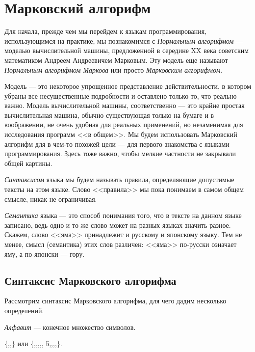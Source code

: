 \setcounter{chapter}{1}
\section{Марковский алгорифм}
\par
Для начала, прежде чем мы перейдем к языкам программирования, использующимся 
на практике, мы познакомимся с \emph{Нормальным алгорифмом} --- моделью 
вычислительной машины, предложенной в середине XX века советским математиком 
Андреем Андреевичем Марковым. Эту модель еще называют \emph{Нормальным 
алгорифмом Маркова} или просто \emph{Марковским алгорифмом}.

Модель --- это некоторое упрощенное представление действительности, в котором
убраны все несущественные подробности и оставлено только то, что реально важно.
Модель вычислительной машины, соответственно --- это крайне простая
вычислительная машина, обычно существующая только на бумаге и в воображении,
не очень удобная для реальных применений, но незаменимая для исследования 
программ <<в общем>>. Мы будем использовать Марковский алгорифм для в чем-то
похожей цели --- для первого знакомства с языками программирования.
Здесь тоже важно, чтобы мелкие частности не закрывали общей картины.

\emph{Синтаксисом} языка мы будем называть правила, определяющие допустимые
тексты на этом языке. Слово <<правила>> мы пока понимаем в самом общем 
смысле, никак не ограничивая.

\emph{Семантика} языка --- это способ понимания того, 
что в тексте на данном языке записано, ведь одно и то же слово может на 
разных языках значить разное. 
Скажем, слово <<яма>> принадлежит и русскому и японскому языку.
 Тем не менее, смысл (семантика) 
этих слов различен: <<яма>> по-русски означает яму, а по-японски --- гору. 

\subsection{Синтаксис Марковского алгорифма}

Рассмотрим синтаксис Марковского алгорифма, для чего дадим несколько 
определений.

\begin{definition}
\emph{Алфавит} --- конечное множество символов. 
\end{definition}
\begin{example} \{,,\}
или \{,,,,,\s
{5},,,,\}.
\end{example}

